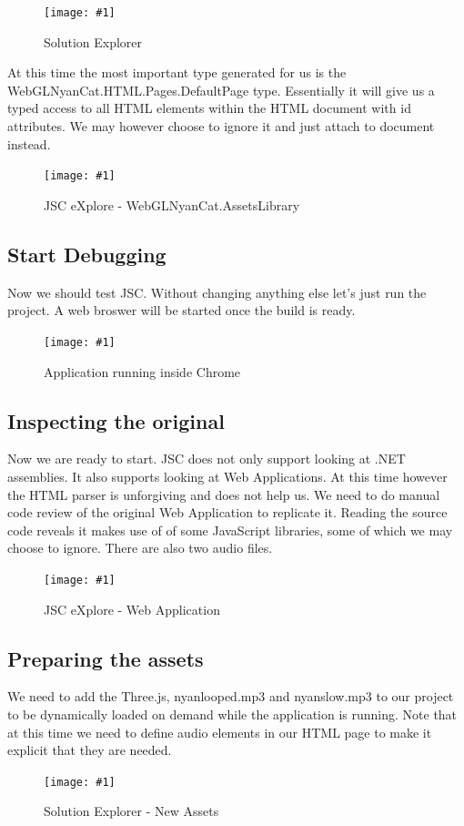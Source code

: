 \documentclass[12pt,leqno]{book}
\newcommand{\png}[1]{\texttt{[image: \#1]}}
\newcommand{\figpng}[2]{\begin{figure}[htb]\centering\png{#1}\caption{#2}\end{figure}}
\begin{document}
\figpng{Images/WebGLNyanCat_-_Microsoft_Visual_Web_Developer_2010_Express-2012-03-31_12.37.24}
{Solution Explorer}

At this time the most important type generated for us is the WebGLNyanCat.HTML.Pages.DefaultPage type. Essentially it will give us a typed access to all HTML elements within the HTML document with id attributes. We may however choose to ignore it and just attach to document instead.

\figpng{Images/eXplore-2012-03-31_12.41.39}
{JSC eXplore - WebGLNyanCat.AssetsLibrary}


\subsection{Start Debugging}
Now we should test JSC. Without changing anything else let's just run the project. A web broswer will be started once the build is ready.



\figpng{Images/A_string_from_JavaScript._-_Google_Chrome-2012-03-31_13.00.11}
{Application running inside Chrome}


\subsection{Inspecting the original}
Now we are ready to start. JSC does not only support looking at .NET assemblies. It also supports looking at Web Applications. At this time however the HTML parser is unforgiving and does not help us. We need to do manual code review of the original Web Application to replicate it. Reading the source code reveals it makes use of of some JavaScript libraries, some of which we may choose to ignore. There are also two audio files. 

\figpng{Images/eXplore-2012-03-31_13.12.27}
{JSC eXplore - Web Application}


\subsection{Preparing the assets}
We need to add the Three.js, nyanlooped.mp3 and nyanslow.mp3 to our project to be dynamically loaded on demand while the application is running. Note that at this time we need to define audio elements in our HTML page to make it explicit that they are needed.

\figpng{Images/WebGLNyanCat_-_Microsoft_Visual_Web_Developer_2010_Express-2012-03-31_13.24.27}
{Solution Explorer - New Assets}
\end{document}

